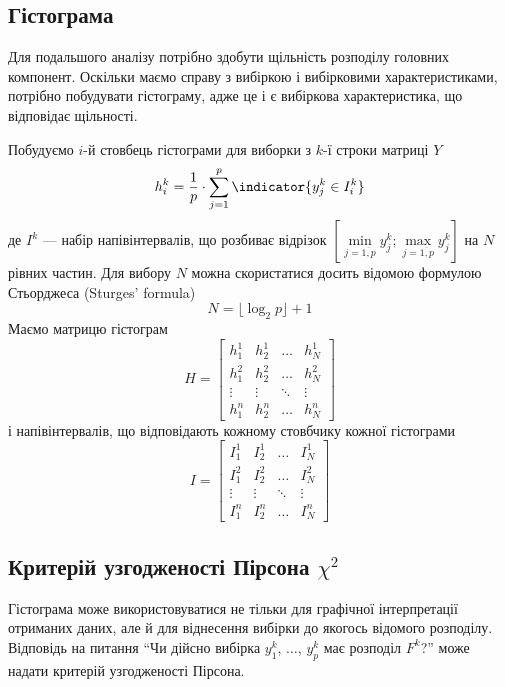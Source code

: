 \subsection{Гістограма}

Для подальшого аналізу потрібно здобути щільність розподілу головних компонент.
Оскільки маємо справу з вибіркою і вибірковими характеристиками,
потрібно побудувати гістограму, адже це і є вибіркова характеристика,
що відповідає щільності.

Побудуємо $i$-й стовбець гістограми для виборки з $k$-ї строки матриці $Y$
\begin{equation*}
  h_i^k = \frac{1}{p} \cdot \sum_{j=1}^{p} \indicator{y_j^k \in I_i^k}
\end{equation*}
де $I^k$ --- набір напівінтервалів, що розбиває відрізок
$\left[ \min\limits_{j=\overline{1,p}}{y_j^k};
\max\limits_{j=\overline{1,p}}{y_j^k} \right]$ на $N$ рівних частин.
Для вибору $N$ можна скористатися досить відомою формулою Стьорджеса
(Sturges' formula) \cite{Sturges:1926:CCI}
\begin{equation*}
  N = \lfloor \log_2 p \rfloor + 1
\end{equation*}
Маємо матрицю гістограм
\begin{equation*}
  H = \begin{bmatrix}
    h_1^1  & h_2^1  & \dots  & h_N^1  \\
    h_1^2  & h_2^2  & \dots  & h_N^2  \\
    \vdots & \vdots & \ddots & \vdots \\
    h_1^n  & h_2^n  & \dots  & h_N^n
  \end{bmatrix}
\end{equation*}
і напівінтервалів, що відповідають кожному стовбчику кожної гістограми
\begin{equation*}
  I = \begin{bmatrix}
    I_1^1  & I_2^1  & \dots  & I_N^1  \\
    I_1^2  & I_2^2  & \dots  & I_N^2  \\
    \vdots & \vdots & \ddots & \vdots \\
    I_1^n  & I_2^n  & \dots  & I_N^n
  \end{bmatrix}
\end{equation*}

\subsection{Критерій узгодженості Пірсона $\chi^2$}
Гістограма може використовуватися не тільки для графічної інтерпретації
отриманих даних, але й для віднесення вибірки до якогось відомого розподілу.
Відповідь на питання ``Чи дійсно вибірка $y_1^k$, $\dots$, $y_p^k$ має розподіл
$F^k$?'' може надати критерій узгодженості Пірсона. %


